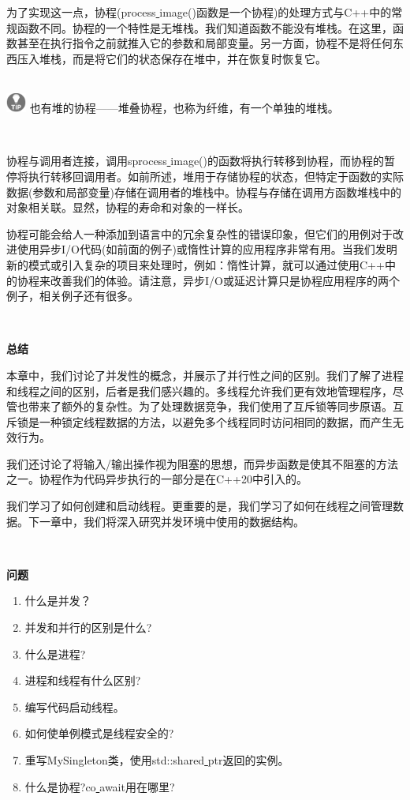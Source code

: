 为了实现这一点，协程(process\underline{ }image()函数是一个协程)的处理方式与C++中的常规函数不同。协程的一个特性是无堆栈。我们知道函数不能没有堆栈。在这里，函数甚至在执行指令之前就推入它的参数和局部变量。另一方面，协程不是将任何东西压入堆栈，而是将它们的状态保存在堆中，并在恢复时恢复它。 \par

\hspace*{\fill} \\ %
\includegraphics[width=0.05\textwidth]{images/tip}
也有堆的协程——堆叠协程，也称为纤维，有一个单独的堆栈。 \par
\noindent\textbf{}\ \par

协程与调用者连接，调用sprocess\underline{ }image()的函数将执行转移到协程，而协程的暂停将执行转移回调用者。如前所述，堆用于存储协程的状态，但特定于函数的实际数据(参数和局部变量)存储在调用者的堆栈中。协程与存储在调用方函数堆栈中的对象相关联。显然，协程的寿命和对象的一样长。 \par
协程可能会给人一种添加到语言中的冗余复杂性的错误印象，但它们的用例对于改进使用异步I/O代码(如前面的例子)或惰性计算的应用程序非常有用。当我们发明新的模式或引入复杂的项目来处理时，例如：惰性计算，就可以通过使用C++中的协程来改善我们的体验。请注意，异步I/O或延迟计算只是协程应用程序的两个例子，相关例子还有很多。 \par

\noindent\textbf{}\ \par
\textbf{总结} \ \par
本章中，我们讨论了并发性的概念，并展示了并行性之间的区别。我们了解了进程和线程之间的区别，后者是我们感兴趣的。多线程允许我们更有效地管理程序，尽管也带来了额外的复杂性。为了处理数据竞争，我们使用了互斥锁等同步原语。互斥锁是一种锁定线程数据的方法，以避免多个线程同时访问相同的数据，而产生无效行为。 \par
我们还讨论了将输入/输出操作视为阻塞的思想，而异步函数是使其不阻塞的方法之一。协程作为代码异步执行的一部分是在C++20中引入的。 \par
我们学习了如何创建和启动线程。更重要的是，我们学习了如何在线程之间管理数据。下一章中，我们将深入研究并发环境中使用的数据结构。 \par

\noindent\textbf{}\ \par
\textbf{问题} \ \par
\begin{enumerate}
	\item 什么是并发？
	\item 并发和并行的区别是什么?
	\item 什么是进程?
	\item 进程和线程有什么区别?
	\item 编写代码启动线程。
	\item 如何使单例模式是线程安全的?
	\item 重写MySingleton类，使用std::shared\underline{ }ptr返回的实例。
	\item 什么是协程?co\underline{ }await用在哪里?
\end{enumerate}

